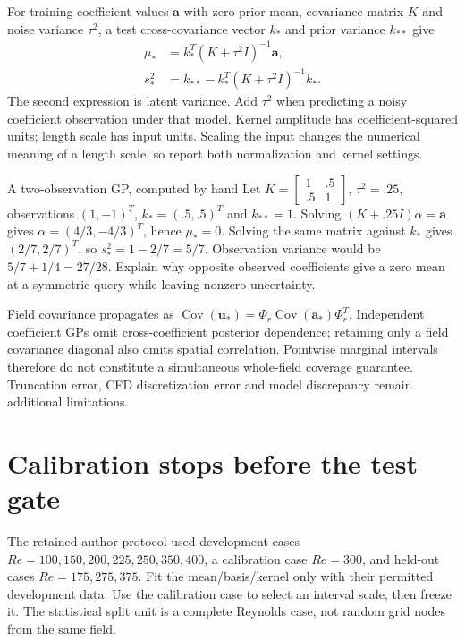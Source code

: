 \documentclass[11pt]{article}
\begin{document}
For training coefficient values $\mathbf a$ with zero prior mean, covariance
matrix $K$ and noise variance $\tau^2$, a test cross-covariance vector $k_*$ and
prior variance $k_{**}$ give
\begin{align*}
\mu_* &= k_*^T(K+\tau^2I)^{-1}\mathbf a,\\
s_*^2 &= k_{**}-k_*^T(K+\tau^2I)^{-1}k_*.
\end{align*}
The second expression is latent variance. Add $\tau^2$ when predicting a noisy
coefficient observation under that model. Kernel amplitude has coefficient-squared
units; length scale has input units. Scaling the input changes the numerical
meaning of a length scale, so report both normalization and kernel settings.

\begin{worked}{A two-observation GP, computed by hand}
Let $K=\left[\begin{smallmatrix}1&.5\\.5&1\end{smallmatrix}\right]$,
$\tau^2=.25$, observations $(1,-1)^T$, $k_*=(.5,.5)^T$ and $k_{**}=1$.
Solving $(K+.25I)\alpha=\mathbf a$ gives
$\alpha=(4/3,-4/3)^T$, hence $\mu_*=0$.
Solving the same matrix against $k_*$ gives $(2/7,2/7)^T$, so
$s_*^2=1-2/7=5/7$. Observation variance would be $5/7+1/4=27/28$.
Explain why opposite observed coefficients give a zero mean at a symmetric
query while leaving nonzero uncertainty.
\end{worked}
Field covariance propagates as
$\operatorname{Cov}(\mathbf u_*)=\Phi_r\operatorname{Cov}(\mathbf a_*)\Phi_r^T$.
Independent coefficient GPs omit cross-coefficient posterior dependence;
retaining only a field covariance diagonal also omits spatial correlation.
Pointwise marginal intervals therefore do not constitute a simultaneous
whole-field coverage guarantee. Truncation error, CFD discretization error and
model discrepancy remain additional limitations.

\section{Calibration stops before the test gate}
The retained author protocol used development cases
$Re=100,150,200,225,250,350,400$, a calibration case $Re=300$,
and held-out cases $Re=175,275,375$. Fit the mean/basis/kernel only with their
permitted development data. Use the calibration case to select an interval
scale, then freeze it. The statistical split unit is a complete Reynolds case,
not random grid nodes from the same field.
\end{document}
